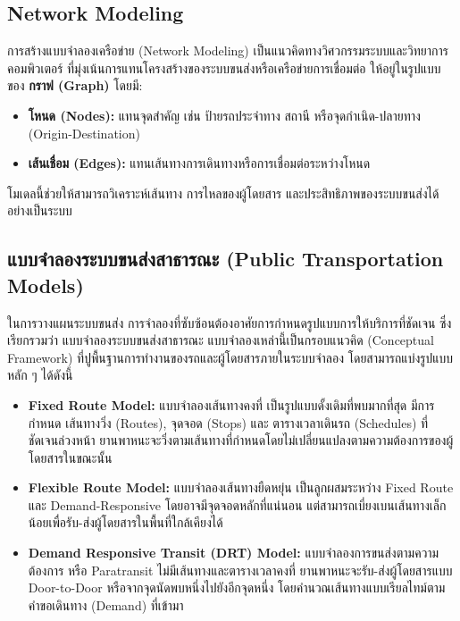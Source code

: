 \subsection{Network Modeling}
\begin{mypara}
    \indent การสร้างแบบจำลองเครือข่าย (Network Modeling) เป็นแนวคิดทางวิศวกรรมระบบและวิทยาการคอมพิวเตอร์ 
    ที่มุ่งเน้นการแทนโครงสร้างของระบบขนส่งหรือเครือข่ายการเชื่อมต่อ 
    ให้อยู่ในรูปแบบของ \textbf{กราฟ (Graph)} โดยมี:
\end{mypara}
\begin{itemize}
    \item \textbf{โหนด (Nodes):} แทนจุดสำคัญ เช่น ป้ายรถประจำทาง สถานี หรือจุดกำเนิด-ปลายทาง (Origin-Destination)
    \item \textbf{เส้นเชื่อม (Edges):} แทนเส้นทางการเดินทางหรือการเชื่อมต่อระหว่างโหนด
\end{itemize}
\begin{mypara}
    โมเดลนี้ช่วยให้สามารถวิเคราะห์เส้นทาง การไหลของผู้โดยสาร และประสิทธิภาพของระบบขนส่งได้อย่างเป็นระบบ
\end{mypara}

\subsection{แบบจำลองระบบขนส่งสาธารณะ (Public Transportation Models)}
\begin{mypara}
    \indent ในการวางแผนระบบขนส่ง การจำลองที่ซับซ้อนต้องอาศัยการกำหนดรูปแบบการให้บริการที่ชัดเจน 
    ซึ่งเรียกรวมว่า แบบจำลองระบบขนส่งสาธารณะ แบบจำลองเหล่านี้เป็นกรอบแนวคิด (Conceptual Framework) 
    ที่ปูพื้นฐานการทำงานของรถและผู้โดยสารภายในระบบจำลอง โดยสามารถแบ่งรูปแบบหลัก ๆ ได้ดังนี้
    \begin{itemize}
        \item \textbf{Fixed Route Model:} แบบจำลองเส้นทางคงที่ เป็นรูปแบบดั้งเดิมที่พบมากที่สุด มีการกำหนด เส้นทางวิ่ง (Routes), จุดจอด (Stops) และ ตารางเวลาเดินรถ (Schedules) ที่ชัดเจนล่วงหน้า ยานพาหนะจะวิ่งตามเส้นทางที่กำหนดโดยไม่เปลี่ยนแปลงตามความต้องการของผู้โดยสารในขณะนั้น
        \item \textbf{Flexible Route Model:} แบบจำลองเส้นทางยืดหยุ่น เป็นลูกผสมระหว่าง Fixed Route และ Demand-Responsive โดยอาจมีจุดจอดหลักที่แน่นอน แต่สามารถเบี่ยงเบนเส้นทางเล็กน้อยเพื่อรับ-ส่งผู้โดยสารในพื้นที่ใกล้เคียงได้
        \item \textbf{Demand Responsive Transit (DRT) Model:} แบบจำลองการขนส่งตามความต้องการ หรือ Paratransit ไม่มีเส้นทางและตารางเวลาคงที่ ยานพาหนะจะรับ-ส่งผู้โดยสารแบบ Door-to-Door หรือจากจุดนัดพบหนึ่งไปยังอีกจุดหนึ่ง โดยคำนวณเส้นทางแบบเรียลไทม์ตามคำขอเดินทาง (Demand) ที่เข้ามา
    \end{itemize}
\end{mypara}

